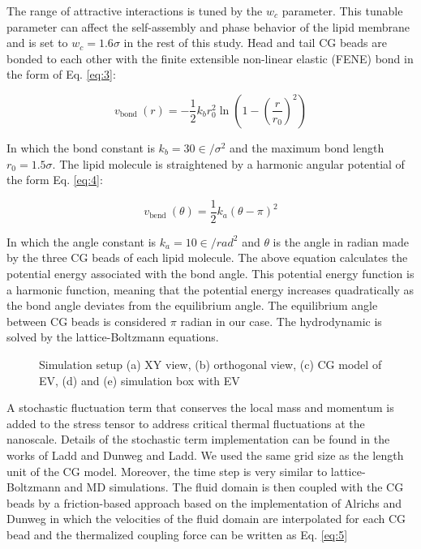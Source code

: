 The range of attractive interactions is tuned by the $w_c$ parameter. This tunable parameter can affect the self-assembly and phase behavior of the lipid membrane and is set to $w_c=1.6\sigma$ in the rest of this study\cite{a53,a54,a55}. Head and tail CG beads are bonded to each other with the finite extensible non-linear elastic (FENE) bond in the form of Eq. \ref{eq:3}:

\vspace{0.5cm}
\begin{equation}\label{eq:3}
v_{\text {bond }}(r)=-\frac{1}{2} k_b r_0^2 \ln \left(1-\left(\frac{r}{r_0}\right)^2\right)
\end{equation}
\vspace{0.5cm}

In which the bond constant is $k_b=30\in/\sigma^2$ and the maximum bond length $r_0=1.5\sigma$. The lipid molecule is straightened by a harmonic angular potential of the form Eq. \ref{eq:4}:

\vspace{0.5cm}
\begin{equation}\label{eq:4}
v_{\text {bend }}(\theta)=\frac{1}{2} k_a(\theta-\pi)^2
\end{equation}
\vspace{0.5cm}

In which the angle constant is $k_a=10\in/rad^2$ and $\theta$ is the angle in radian made by the three CG beads of each lipid molecule. The above equation calculates the  potential energy associated with the bond angle. This potential energy function is a harmonic function, meaning that the potential energy increases quadratically as the bond angle deviates from the equilibrium angle. The equilibrium angle between CG beads is considered $\pi$ radian in our case. The hydrodynamic is solved by the lattice-Boltzmann equations\cite{a56,a57}.

\begin{figure}[htbp]
  \centering
  
  \vspace{0.5cm}
  \caption{ Simulation setup (a) XY view, (b) orthogonal view, (c) CG model of EV, (d) and (e) simulation box with EV}
  \vspace{0.5cm}
  \label{fig:2}
\end{figure}

A stochastic fluctuation term that conserves the local mass and momentum is added to the stress tensor to address critical thermal fluctuations at the nanoscale. Details of the stochastic term implementation can be found in the works of Ladd \cite{a58} and Dunweg and Ladd\cite{a59}. We used the same grid size as the length unit of the CG model. Moreover, the time step is very similar to lattice-Boltzmann and MD simulations. The fluid domain is then coupled with the CG beads by a friction-based approach based on the implementation of Alrichs and Dunweg\cite{a46} in which the velocities of the fluid domain are interpolated for each CG bead and the thermalized coupling force can be written as Eq. \ref{eq:5}

